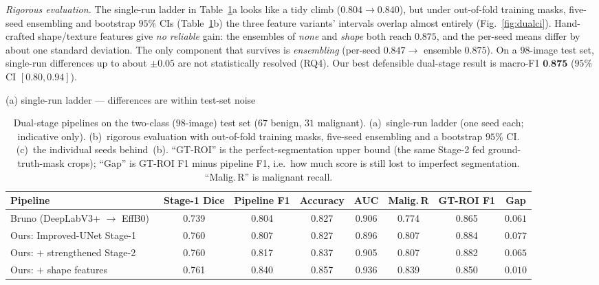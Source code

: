 \documentclass[11pt]{article}
\newcommand{\best}[1]{\textbf{#1}}
\begin{document}
\emph{Rigorous evaluation.} The single-run ladder in Table~\ref{tab:dual}a looks
like a tidy climb ($0.804\to0.840$), but under out-of-fold training masks,
five-seed ensembling and bootstrap $95\%$ CIs (Table~\ref{tab:dual}b) the three
feature variants' intervals overlap almost entirely (Fig.~\ref{fig:dualci}).
Hand-crafted shape/texture features give \emph{no reliable} gain: the ensembles of
\emph{none} and \emph{shape} both reach $0.875$, and the per-seed means differ by
about one standard deviation. The only component that survives is
\emph{ensembling} (per-seed $0.847\to$ ensemble $0.875$). On a $98$-image test set,
single-run differences up to about $\pm0.05$ are not statistically resolved (RQ4).
Our best defensible dual-stage result is macro-F1 $\best{0.875}$ ($95\%$ CI
$[0.80,0.94]$).

\begin{table}[t]
\centering
\caption{Dual-stage pipelines on the two-class ($98$-image) test set
($67$ benign, $31$ malignant). (a)~single-run ladder (one seed each; indicative
only). (b)~rigorous evaluation with out-of-fold training masks, five-seed
ensembling and a bootstrap $95\%$ CI. (c)~the individual seeds behind~(b).
``GT-ROI'' is the perfect-segmentation upper bound (the same Stage-2 fed
ground-truth-mask crops); ``Gap'' is GT-ROI F1 minus pipeline F1, i.e.\ how much
score is still lost to imperfect segmentation. ``Malig.\,R'' is malignant recall.}
\label{tab:dual}
\smallskip
(a) single-run ladder --- differences are within test-set noise\\[2pt]
\scriptsize
\setlength{\tabcolsep}{4.4pt}
\begin{tabular}{@{}lccccccc@{}}
\toprule
Pipeline & Stage-1 Dice & Pipeline F1 & Accuracy & AUC & Malig.\,R & GT-ROI F1 & Gap \\
\midrule
Bruno (DeepLabV3+ $\to$ EffB0)~\cite{bruno2025dualstage} & 0.739 & 0.804 & 0.827 & 0.906 & 0.774 & 0.865 & $0.061$ \\
Ours: Improved-UNet Stage-1                              & 0.760 & 0.807 & 0.827 & 0.896 & 0.807 & 0.884 & $0.077$ \\
Ours: $+$ strengthened Stage-2                           & 0.760 & 0.817 & 0.837 & 0.905 & 0.807 & 0.882 & $0.065$ \\
Ours: $+$ shape features                                 & 0.761 & 0.840 & 0.857 & 0.936 & 0.839 & 0.850 & $0.010$ \\
\bottomrule
\end{tabular}
\smallskip


\end{table}
\end{document}
